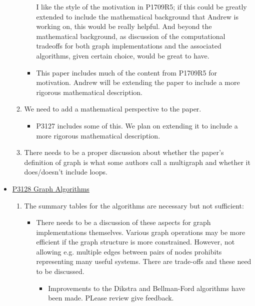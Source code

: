 \begin{itemize}
\begin{enumerate}
\begin{itemize}
                                    I like the style of the motivation in P1709R5; if this could be greatly extended to include the mathematical background that Andrew is 
                                    working on, this would be really helpful. And beyond the mathematical background, as discussion of the computational tradeoffs for 
                                    both graph implementations and the associated algorithms, given certain choice, would be great to have.
                              \item This paper includes much of the content from P1709R5 for motivation. Andrew will be extending the paper to include a more rigorous 
                                    mathematical description.
                        \end{itemize}
                  \item We need to add a mathematical perspective to the paper.
                        \begin{itemize}
                              \item P3127 includes some of this. We plan on extending it to include a more rigorous mathematical description.
                        \end{itemize}
                  \item There needs to be a proper discussion about whether the paper's definition of graph is what some authors call a multigraph 
                        and whether it does/doesn't include loops.
      \end{enumerate}
      \item \href{https://www.wg21.link/P3128}{P3128 Graph Algorithms}
            \begin{enumerate}
                  \item The summary tables for the algorithms are necessary but not sufficient: 
                        \begin{itemize}
                              \item There needs to be a discussion of these aspects for graph implementations themselves. Various graph operations may 
                                    be more efficient if the graph structure is more constrained. However, not allowing e.g. multiple edges between pairs 
                                    of nodes prohibits representing many useful systems. There are trade-offs and these need to be discussed.
                                    \begin{itemize}
                                          \item Improvements to the Dikstra and Bellman-Ford algorithms have been made. PLease review give feedback.

\end{itemize}
\end{itemize}
\end{enumerate}
\end{itemize}
